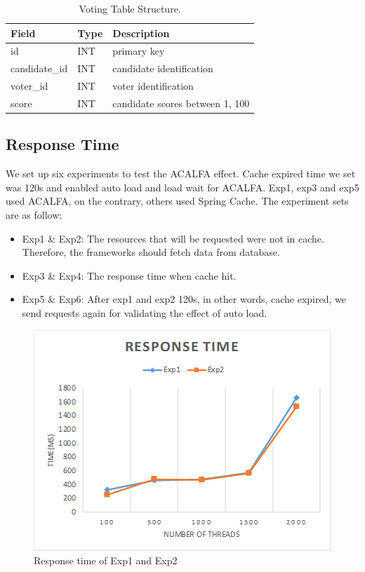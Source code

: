 \documentclass{singlecol-new}
\theoremstyle{TH}{
\newtheorem{lemma}{Lemma}
\newtheorem{theorem}[lemma]{Theorem}
\newtheorem{corrolary}[lemma]{Corrolary}
\newtheorem{conjecture}[lemma]{Conjecture}
\newtheorem{proposition}[lemma]{Proposition}
\newtheorem{claim}[lemma]{Claim}
\newtheorem{stheorem}[lemma]{Wrong Theorem}
}
\theoremstyle{THrm}{
\newtheorem{definition}{Definition}[section]
\newtheorem{question}{Question}[section]
\newtheorem{remark}{Remark}
\newtheorem{scheme}{Scheme}
}
\theoremstyle{THhit}{
\newtheorem{case}{Case}[section]
}
\begin{document}
\begin{table}[htb]
\begin{center}
 \caption{\label{VTS}Voting Table Structure.}
 \begin{tabular}{lll}
 \toprule
    Field & Type & Description\\
 \midrule
    id & INT & primary key\\
    candidate\_id & INT & candidate identification\\
    voter\_id & INT & voter identification\\
    score & INT & candidate scores between 1, 100\\
\bottomrule
 \end{tabular}
\end{center}
\end{table}

\subsection{Response Time}

We set up six experiments to test the ACALFA effect. Cache expired time we set was 120s and enabled auto load and load wait for ACALFA. Exp1, exp3 and exp5 used ACALFA, on the contrary, others used Spring Cache. The experiment sets are as follow:

\begin{itemize}
    \item Exp1 \& Exp2: The resources that will be requested were not in cache. Therefore, the frameworks should fetch data from database.
    \item Exp3 \& Exp4: The response time when cache hit.
    \item Exp5 \& Exp6: After exp1 and exp2 120s, in other words, cache expired, we send requests again for validating the effect of auto load.
\end{itemize}

\begin{figure} [htb]
    \centering
    \includegraphics[width=1\linewidth]{img/exp1-2.png}
    \caption{Response time of Exp1 and Exp2}
    \label{exp1-2}
\end{figure}
\end{document}
